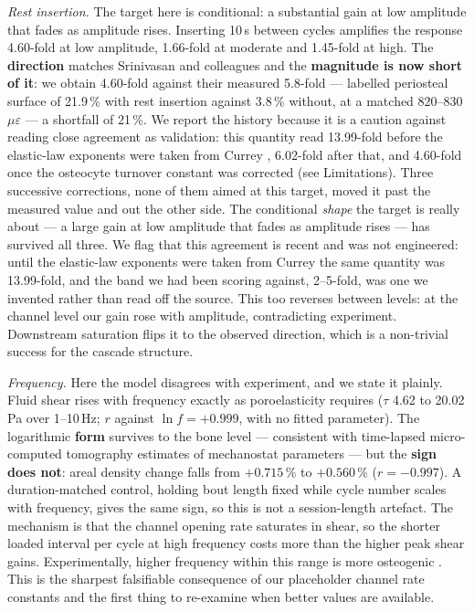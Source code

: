 \documentclass[10pt,letterpaper]{article}
\begin{document}
\emph{Rest insertion.} The target here is conditional: a substantial gain at
low amplitude that fades as amplitude rises. Inserting 10\,s between cycles
amplifies the response 4.60-fold at low amplitude, 1.66-fold at moderate and
1.45-fold at high. The \textbf{direction} matches Srinivasan and
colleagues \cite{srinivasan2002} and the \textbf{magnitude is now short of it}:
we obtain 4.60-fold against their measured 5.8-fold --- labelled periosteal
surface of 21.9\,\% with rest insertion against 3.8\,\% without, at a matched
820--830\,$\mu\varepsilon$ --- a shortfall of 21\,\%. We report the history
because it is a caution against reading close agreement as validation: this
quantity read 13.99-fold before the elastic-law exponents were taken from
Currey \cite{currey1988}, 6.02-fold after that, and 4.60-fold once the
osteocyte turnover constant was corrected (see Limitations). Three successive
corrections, none of them aimed at this target, moved it past the measured
value and out the other side. The conditional \emph{shape} the target is really
about --- a large gain at low amplitude that fades as amplitude rises --- has
survived all three. We
flag that this agreement is recent and was not engineered: until the elastic-law
exponents were taken from Currey the same quantity was 13.99-fold, and the band
we had been scoring against, 2--5-fold, was one we invented rather than read off
the source. This too reverses between
levels: at the channel level our gain rose with amplitude, contradicting
experiment. Downstream saturation flips it to the observed direction, which is
a non-trivial success for the cascade structure.

\emph{Frequency.} Here the model disagrees with experiment, and we state it
plainly. Fluid shear rises with frequency exactly as poroelasticity requires
($\tau$ 4.62 to 20.02\,Pa over 1--10\,Hz; $r$ against $\ln f = +0.999$, with
no fitted parameter). The logarithmic \textbf{form} survives to the bone level
--- consistent with time-lapsed micro-computed tomography estimates of
mechanostat parameters \cite{marques2023} --- but the \textbf{sign does not}:
areal density change falls from $+0.715\,\%$ to $+0.560\,\%$ ($r = -0.997$). A
duration-matched control, holding bout length fixed while cycle number scales
with frequency, gives the same sign, so this is not a session-length artefact.
The mechanism is that the channel opening rate saturates in shear, so the
shorter loaded interval per cycle at high frequency costs more than the higher
peak shear gains. Experimentally, higher frequency within this range is more
osteogenic \cite{hsieh2001}. This is the sharpest falsifiable consequence of
our placeholder channel rate constants and the first thing to re-examine when
better values are available.
\end{document}
